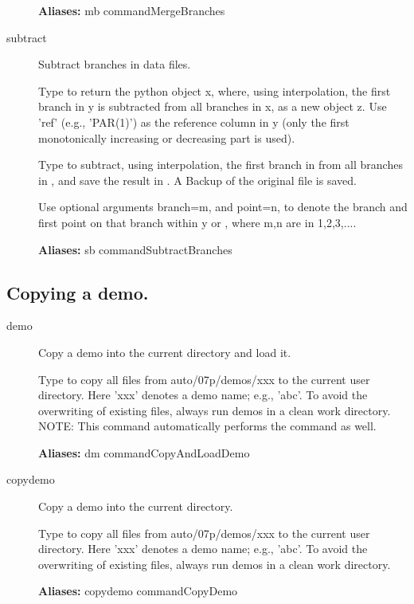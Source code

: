 \documentclass[12pt]{report}
\begin{document}
\begin{description}
\textbf{Aliases:} mb commandMergeBranches

\item[subtract]
Subtract branches in data files.

    Type  to return the python object x, where,
    using interpolation, the first branch in y is subtracted from all
    branches in x, as a new object z.
    Use 'ref' (e.g., 'PAR(1)')  as the reference column in y
    (only the first monotonically increasing or decreasing part is used).

    Type  to subtract, using interpolation, the first
    branch in  from all branches in ,
    and save the result in .
    A Backup of the original file is saved.

    Use optional arguments branch=m, and point=n, to denote the branch and
    first point on that branch within y or , where m,n are in
    {1,2,3,...}.

\textbf{Aliases:} sb commandSubtractBranches

\end{description}

\subsection{Copying a demo.}
\label{sec:clui_ref_demo}
\begin{description}
\item[demo]
Copy a demo into the current directory and load it.

    Type  to copy all files from auto/07p/demos/xxx to the
    current user directory.  Here 'xxx' denotes a demo name; e.g.,
    'abc'.  To avoid the overwriting of existing files, always run
    demos in a clean work directory.  NOTE: This command automatically
    performs the  command as well.
    
\textbf{Aliases:} dm commandCopyAndLoadDemo

\item[copydemo]
Copy a demo into the current directory.

    Type  to copy all files from auto/07p/demos/xxx to the
    current user directory.  Here 'xxx' denotes a demo name; e.g.,
    'abc'.  To avoid the overwriting of existing
    files, always run demos in a clean work directory.
    
\textbf{Aliases:} copydemo commandCopyDemo
\end{description}
\end{document}
